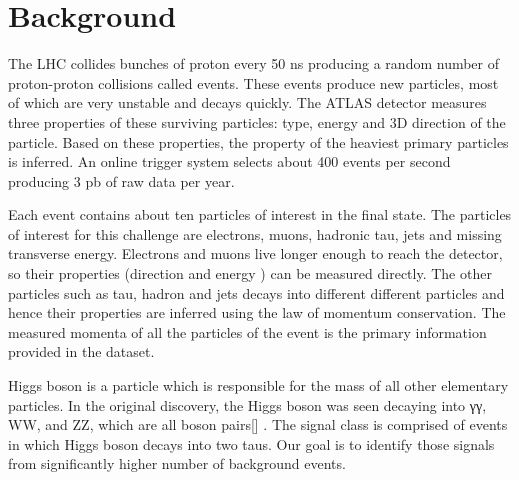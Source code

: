 \section{Background}
\label{sec:background}

The LHC collides bunches of proton every 50 ns producing a random number of proton-proton collisions called events. These events produce new particles, most of which are very unstable and decays quickly. The ATLAS detector measures three properties of these surviving particles: type, energy and 3D direction of the particle. Based on these properties,  the property of the heaviest primary particles is inferred. An online trigger system selects about 400 events per second producing 3 pb of raw data per year.

Each event contains about ten particles of interest in the final state. The particles of interest for this challenge are electrons, muons, hadronic tau, jets and missing transverse energy. Electrons and muons live longer enough to reach the detector, so their properties (direction and energy ) can be measured directly. The other particles such as tau, hadron and jets decays into different different particles and hence their properties are inferred using the law of momentum conservation.  The measured momenta of all the particles of the event is the primary information provided in the dataset. 

Higgs boson is a particle which is responsible for the mass of all other elementary particles. In the original discovery, the Higgs boson was seen decaying into γγ, WW, and ZZ, which are all boson pairs[] . The signal class is comprised of events in which Higgs boson decays into two taus. Our goal is to identify those signals from significantly higher number of background events.
